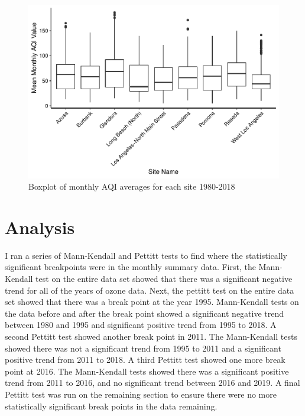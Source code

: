 \documentclass[12pt,]{article}
\newenvironment{Shaded}{\begin{snugshade}}{\end{snugshade}}
\newcommand{\KeywordTok}[1]{\textcolor[rgb]{0.13,0.29,0.53}{\textbf{#1}}}
\newcommand{\OperatorTok}[1]{\textcolor[rgb]{0.81,0.36,0.00}{\textbf{#1}}}
\newcommand{\NormalTok}[1]{#1}
\begin{document}
\begin{figure}
\centering
\includegraphics{Roth_ENV872_Project_files/figure-latex/exploratory graph3-1.pdf}
\caption{Boxplot of monthly AQI averages for each site 1980-2018}
\end{figure}

\newpage

\section{Analysis}\label{analysis}

I ran a series of Mann-Kendall and Pettitt tests to find where the
statistically significant breakpoints were in the monthly summary data.
First, the Mann-Kendall test on the entire data set showed that there
was a significant negative trend for all of the years of ozone data.
Next, the pettitt test on the entire data set showed that there was a
break point at the year 1995. Mann-Kendall tests on the data before and
after the break point showed a significant negative trend between 1980
and 1995 and significant positive trend from 1995 to 2018. A second
Pettitt test showed another break point in 2011. The Mann-Kendall tests
showed there was not a significant trend from 1995 to 2011 and a
significant positive trend from 2011 to 2018. A third Pettitt test
showed one more break point at 2016. The Mann-Kendall tests showed there
was a significant positive trend from 2011 to 2016, and no significant
trend between 2016 and 2019. A final Pettitt test was run on the
remaining section to ensure there were no more statistically significant
break points in the data remaining.

\begin{Shaded}
\end{Shaded}
\end{document}
